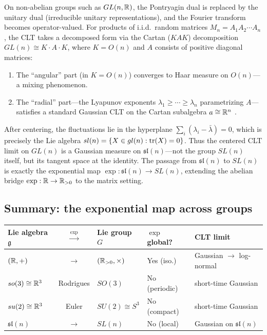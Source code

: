 On non-abelian groups such as $GL(n, \mathbb{R})$, the Pontryagin dual is replaced by the unitary dual (irreducible unitary representations), and the Fourier transform becomes operator-valued. For products of i.i.d.\ random matrices $M_n = A_1 A_2 \cdots A_n$, the CLT takes a decomposed form via the Cartan ($KAK$) decomposition $GL(n) \cong K \cdot A \cdot K$, where $K = O(n)$ and $A$ consists of positive diagonal matrices:
\begin{enumerate}[label=(\roman*)]
\item The ``angular'' part (in $K = O(n)$) converges to Haar measure on $O(n)$---a mixing phenomenon.
\item The ``radial'' part---the Lyapunov exponents $\lambda_1 \geq \cdots \geq \lambda_n$ parametrizing $A$---satisfies a standard Gaussian CLT on the Cartan subalgebra $a \cong \mathbb{R}^n$ \cite{BQ}.
\end{enumerate}
After centering, the fluctuations lie in the hyperplane $\sum_i (\lambda_i - \bar{\lambda}) = 0$, which is precisely the Lie algebra $sl(n) = \{X \in gl(n) : \operatorname{tr}(X) = 0\}$. Thus the centered CLT limit on $GL(n)$ is a Gaussian measure on $\mathfrak{sl}(n)$---not the group $SL(n)$ itself, but its tangent space at the identity. The passage from $\mathfrak{sl}(n)$ to $SL(n)$ is exactly the exponential map $\exp : \mathfrak{sl}(n) \to SL(n)$, extending the abelian bridge $\exp : \mathbb{R} \to \mathbb{R}_{>0}$ to the matrix setting.

\subsection*{Summary: the exponential map across groups}

\begin{center}
\renewcommand{\arraystretch}{1.5}
\small
\begin{tabular}{lclll}
\textbf{Lie algebra $\mathfrak{g}$} & $\xrightarrow{\exp}$ & \textbf{Lie group $G$} & \textbf{$\exp$ global?} & \textbf{CLT limit} \\
\hline
$(\mathbb{R}, +)$ & $\to$ & $(\mathbb{R}_{>0}, \times)$ & Yes (iso.) & Gaussian $\to$ log-normal \\
$so(3) \cong \mathbb{R}^3$ & Rodrigues & $SO(3)$ & No (periodic) & short-time Gaussian \\
$su(2) \cong \mathbb{R}^3$ & Euler & $SU(2) \cong S^3$ & No (compact) & short-time Gaussian \\
$\mathfrak{sl}(n)$ & $\to$ & $SL(n)$ & No (local) & Gaussian on $\mathfrak{sl}(n)$
\end{tabular}
\end{center}

